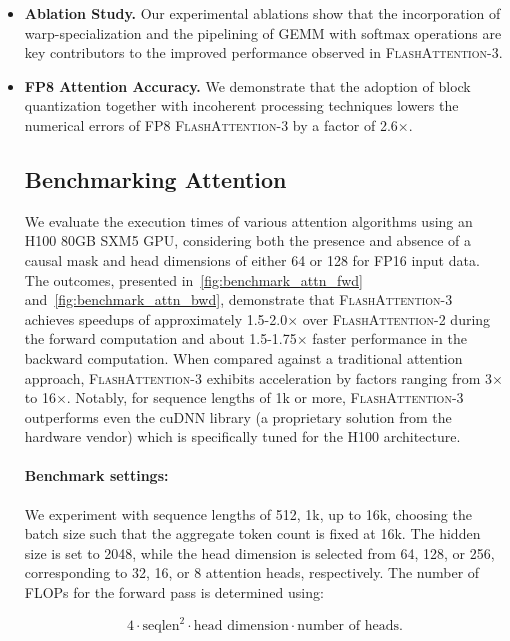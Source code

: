 \begin{algorithm}[H]
\begin{algorithmic}[1]
\begin{itemize}
\item \textbf{Ablation Study.} Our experimental ablations show that the incorporation of warp-specialization and the pipelining of GEMM with softmax operations are key contributors to the improved performance observed in \textsc{FlashAttention-3}.

\item \textbf{FP8 Attention Accuracy.} We demonstrate that the adoption of block quantization together with incoherent processing techniques lowers the numerical errors of FP8 \textsc{FlashAttention-3} by a factor of 2.6$\times$.

\subsection{Benchmarking Attention}
\label{subsec:benchmark_attn}

We evaluate the execution times of various attention algorithms using an H100 80GB SXM5 GPU, considering both the presence and absence of a causal mask and head dimensions of either 64 or 128 for FP16 input data. The outcomes, presented in~\cref{fig:benchmark_attn_fwd} and~\cref{fig:benchmark_attn_bwd}, demonstrate that \textsc{FlashAttention-3} achieves speedups of approximately 1.5-2.0$\times$ over \textsc{FlashAttention-2} during the forward computation and about 1.5-1.75$\times$ faster performance in the backward computation. When compared against a traditional attention approach, \textsc{FlashAttention-3} exhibits acceleration by factors ranging from 3$\times$ to 16$\times$. Notably, for sequence lengths of 1k or more, \textsc{FlashAttention-3} outperforms even the cuDNN library (a proprietary solution from the hardware vendor) which is specifically tuned for the H100 architecture.

\paragraph{Benchmark settings:} We experiment with sequence lengths of 512, 1k, up to 16k, choosing the batch size such that the aggregate token count is fixed at 16k. The hidden size is set to 2048, while the head dimension is selected from 64, 128, or 256, corresponding to 32, 16, or 8 attention heads, respectively. The number of FLOPs for the forward pass is determined using:

\begin{equation*}
  4 \cdot \text{seqlen}^2 \cdot \text{head dimension} \cdot \text{number of heads}.
\end{equation*}


\end{itemize}
\end{algorithmic}
\end{algorithm}

